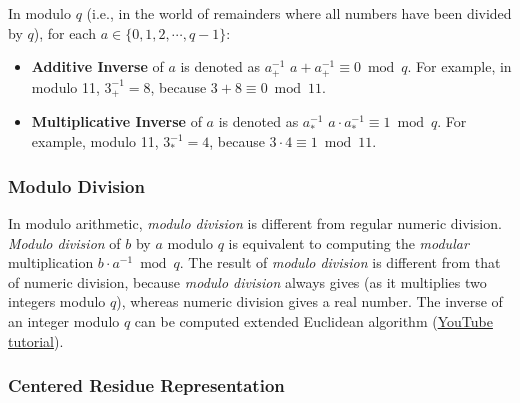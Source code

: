 \begin{tcolorbox}[title={\textbf{\tboxdef{\ref*{subsec:modulo-inverse}} Inverse in Modulo Arithmetic}}]

In modulo $q$ (i.e., in the world of remainders where all numbers have been divided by $q$), for each $a \in \{0, 1, 2, \cdots, q-1\}$:

\begin{itemize}

\item \textbf{Additive Inverse} of $a$ is denoted as $a_+^{-1}$  $a + a_+^{-1} \equiv 0 \bmod q$. For example, in modulo 11, $3_+^{-1} = 8$, because $3 + 8 \equiv 0 \bmod 11$.

\item \textbf{Multiplicative Inverse} of $a$ is denoted as $a_*^{-1}$  $a \cdot a_*^{-1} \equiv 1 \bmod{q}$.  For example, modulo 11, $3_*^{-1} = 4$, because $3 \cdot 4 \equiv 1 \bmod{11}$.

\end{itemize}

\end{tcolorbox}

\subsubsection{Modulo Division}
\label{subsec:modulo-division}

In modulo arithmetic, \textit{modulo division} is different from regular numeric division.   \textit{Modulo division} of $b$ by $a$ modulo $q$ is equivalent to computing the \textit{modular} multiplication $b \cdot a^{-1} \bmod q$. The result of \textit{modulo division} is different from that of numeric division, because \textit{modulo division} always gives  (as it multiplies two integers modulo $q$), whereas numeric division gives a real number. The inverse of an integer modulo $q$ can be computed  extended Euclidean algorithm (\href{https://www.youtube.com/watch?v=fz1vxq5ts5I}{YouTube tutorial}).

\subsubsection{Centered Residue Representation}
\label{subsec:modulo-centered}

